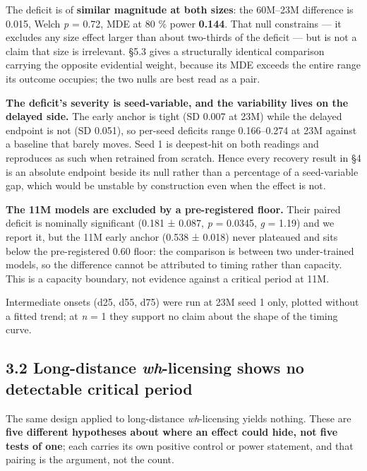 \documentclass[11pt]{article}
\begin{document}
The deficit is of \textbf{similar magnitude at both sizes}: the 60M--23M difference is 0.015,
Welch \emph{p} = 0.72, MDE at 80 \% power \textbf{0.144}. That null constrains — it excludes any size
effect larger than about two-thirds of the deficit — but is not a claim that size is
irrelevant. §5.3 gives a structurally identical comparison carrying the opposite evidential
weight, because its MDE exceeds the entire range its outcome occupies; the two nulls are
best read as a pair.

\textbf{The deficit's severity is seed-variable, and the variability lives on the delayed side.}
The early anchor is tight (SD 0.007 at 23M) while the delayed endpoint is not (SD 0.051), so
per-seed deficits range 0.166--0.274 at 23M against a baseline that barely moves. Seed 1 is
deepest-hit on both readings and reproduces as such when retrained from scratch. Hence every
recovery result in §4 is an absolute endpoint beside its null rather than a percentage of a
seed-variable gap, which would be unstable by construction even when the effect is not.

\textbf{The 11M models are excluded by a pre-registered floor.} Their paired deficit is
nominally significant (0.181 ± 0.087, \emph{p} = 0.0345, \emph{g} = 1.19) and we report it, but the 11M
early anchor (0.538 ± 0.018) never plateaued and sits below the pre-registered 0.60 floor:
the comparison is between two under-trained models, so the difference cannot be attributed
to timing rather than capacity. This is a capacity boundary, not evidence against a critical
period at 11M.

Intermediate onsets (d25, d55, d75) were run at 23M seed 1 only, plotted without a fitted
trend; at \emph{n} = 1 they support no claim about the shape of the timing curve.

\subsection{\texorpdfstring{3.2 Long-distance \emph{wh}-licensing shows no detectable critical period}{3.2 Long-distance wh-licensing shows no detectable critical period}}\label{long-distance-wh-licensing-shows-no-detectable-critical-period}

The same design applied to long-distance \emph{wh}-licensing yields nothing. These are \textbf{five
different hypotheses about where an effect could hide, not five tests of one}; each carries
its own positive control or power statement, and that pairing is the argument, not the count.
\end{document}
